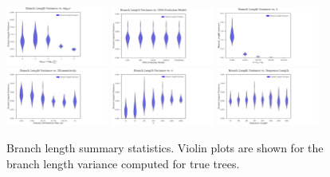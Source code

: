 \begin{figure} %
\centering
\includegraphics[width=0.3\textwidth]{figs/dualbirth-tree-bl-supp-a}
\includegraphics[width=0.3\textwidth]{figs/dualbirth-tree-bl-supp-b}
\includegraphics[width=0.3\textwidth]{figs/dualbirth-tree-bl-supp-c}\\
\includegraphics[width=0.3\textwidth]{figs/dualbirth-tree-bl-supp-d}
\includegraphics[width=0.3\textwidth]{figs/dualbirth-tree-bl-supp-e}
\includegraphics[width=0.3\textwidth]{figs/dualbirth-tree-bl-supp-f}
\caption[Branch length summary statistics]
{Branch length summary statistics. Violin plots are shown for the branch length variance computed for true trees.}
\label{fig:dualbirth-tree-bl-supp}
\end{figure}


